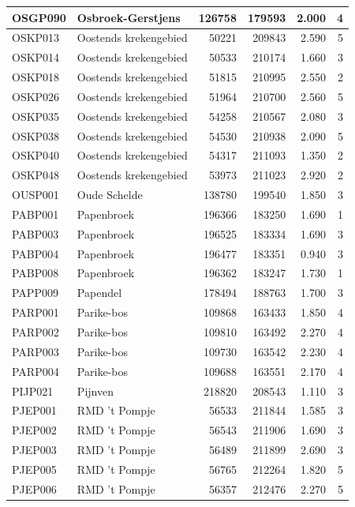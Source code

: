 \documentclass[11pt,]{book}
\begin{document}
\begin{table}
\begin{tabular}[t]{l|l|r|r|r|r}
\hline
OSGP090 & Osbroek-Gerstjens & 126758 & 179593 & 2.000 & 4\\
\hline
OSKP013 & Oostends krekengebied & 50221 & 209843 & 2.590 & 5\\
\hline
OSKP014 & Oostends krekengebied & 50533 & 210174 & 1.660 & 3\\
\hline
OSKP018 & Oostends krekengebied & 51815 & 210995 & 2.550 & 2\\
\hline
OSKP026 & Oostends krekengebied & 51964 & 210700 & 2.560 & 5\\
\hline
OSKP035 & Oostends krekengebied & 54258 & 210567 & 2.080 & 3\\
\hline
OSKP038 & Oostends krekengebied & 54530 & 210938 & 2.090 & 5\\
\hline
OSKP040 & Oostends krekengebied & 54317 & 211093 & 1.350 & 2\\
\hline
OSKP048 & Oostends krekengebied & 53973 & 211023 & 2.920 & 2\\
\hline
OUSP001 & Oude Schelde & 138780 & 199540 & 1.850 & 3\\
\hline
PABP001 & Papenbroek & 196366 & 183250 & 1.690 & 1\\
\hline
PABP003 & Papenbroek & 196525 & 183334 & 1.690 & 3\\
\hline
PABP004 & Papenbroek & 196477 & 183351 & 0.940 & 3\\
\hline
PABP008 & Papenbroek & 196362 & 183247 & 1.730 & 1\\
\hline
PAPP009 & Papendel & 178494 & 188763 & 1.700 & 3\\
\hline
PARP001 & Parike-bos & 109868 & 163433 & 1.850 & 4\\
\hline
PARP002 & Parike-bos & 109810 & 163492 & 2.270 & 4\\
\hline
PARP003 & Parike-bos & 109730 & 163542 & 2.230 & 4\\
\hline
PARP004 & Parike-bos & 109688 & 163551 & 2.170 & 4\\
\hline
PIJP021 & Pijnven & 218820 & 208543 & 1.110 & 3\\
\hline
PJEP001 & RMD 't Pompje & 56533 & 211844 & 1.585 & 3\\
\hline
PJEP002 & RMD 't Pompje & 56543 & 211906 & 1.690 & 3\\
\hline
PJEP003 & RMD 't Pompje & 56489 & 211899 & 2.690 & 3\\
\hline
PJEP005 & RMD 't Pompje & 56765 & 212264 & 1.820 & 5\\
\hline
PJEP006 & RMD 't Pompje & 56357 & 212476 & 2.270 & 5\\
\hline

\end{tabular}
\end{table}
\end{document}
